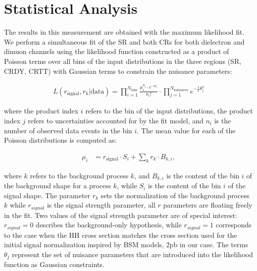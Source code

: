 \chapter{Statistical Analysis}
\label{ch:statistics}


The results in this measurement are obtained with the maximum likelihood fit. We perform a simultaneous fit of the SR and both CRs for both dielectron and dimuon channels using the likelihood function constructed as a product
of Poisson terms over all bins of the input \mTHH distributions in the three regions (SR, CRDY, CRTT) with Gaussian terms to constrain the nuisance parameters:

\begin{align*}
 L(r_{\text{signal}}, r_{k}|\text{data}) = \prod_{i=1}^{N_{\mathrm{bins}}}\frac{\mu_{i}^{n_{i}}\cdot e^{-\mu_{i}}}{n_{i}!}
\cdot \prod_{j=1}^{N_{\mathrm{nuisances}}} e^{-\frac{1}{2}\theta_{j}^{2}}
\end{align*}

\noindent where the product index $i$ refers to the bin of the input distributions, the product index $j$
refers to uncertainties accounted for by the fit model, and $n_i$ is the number of observed data
events in the bin $i$. The mean value for each of the Poisson distributions is computed as:


\begin{align*}
\mu_{i} &= r_{\text{signal}} \cdot S_{i} + \sum_{k}r_{k}\cdot B_{k,i},
\end{align*}


\noindent where $k$ refers to the background process $k$, and $B_{k,i}$ is the content of the bin $i$ of the background
shape for a process $k$, while $S_i$ is the content of the bin $i$ of the signal shape. The parameter $r_k$
sets the normalization of the background process $k$ while $r_{signal}$ is the signal strength parameter, all $r$ parameters are floating freely in the fit.
Two values of the signal strength parameter are of special interest:  $r_{signal} = 0$ describes the
background-only hypothesis, while $r_{signal} = 1$ corresponds to the case when the HH cross section
matches the cross section used for the initial signal normalization inspired by BSM models, 2pb in our case. 
The terms $\theta_j$ represent the set of nuisance parameters that are introduced into the likelihood
function as Gaussian constraints. 


